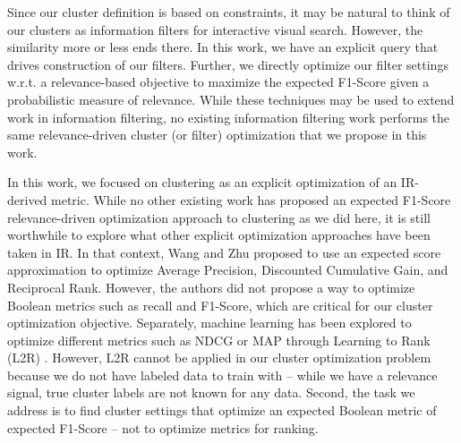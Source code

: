 Since our cluster definition is based on constraints, it may be natural to think of our clusters as information filters for interactive visual search.  However, the similarity more or less ends there.  In this work, we have an explicit query that drives construction of our filters.  Further, we directly optimize our filter settings w.r.t. a relevance-based objective to maximize the expected F1-Score given a probabilistic measure of relevance.  While these techniques may be used to extend work in information filtering, no existing information filtering work performs the same relevance-driven cluster (or filter) optimization that we propose in this work.




In this work, we focused on clustering as an explicit optimization of an IR-derived metric.  While no other existing work has proposed an expected F1-Score relevance-driven optimization approach to clustering as we did here, it is still worthwhile to explore what other explicit optimization approaches have been taken in IR. %
In that context,  Wang and Zhu \cite{Wang2010} proposed to use an expected score approximation to optimize Average Precision, Discounted Cumulative Gain, and Reciprocal Rank. However, the authors did not propose a way to optimize Boolean metrics such as recall and F1-Score, which are critical for our cluster optimization objective. 
Separately, machine learning has been explored to optimize different metrics such as NDCG or MAP through Learning to Rank (L2R) \cite{Baeza-Yates2010}. 
However, L2R cannot be applied in our cluster optimization problem because we do not have labeled data to train with -- while we have a relevance signal, true cluster labels are not known for any data.  Second, the task we address is to find cluster settings that optimize an expected Boolean metric of expected F1-Score -- not to optimize metrics for ranking.

